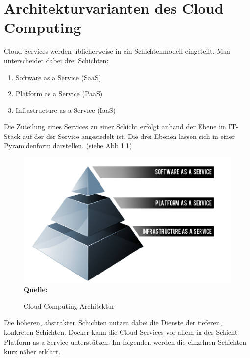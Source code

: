 \chapter{Architekturvarianten des Cloud Computing}
\label{cha:architekturvarianten_des_cloud_computing}
Cloud-Services werden üblicherweise in ein Schichtenmodell eingeteilt. Man unterscheidet dabei drei Schichten:
\begin{enumerate}
      \itemsep0pt
      \item Software as a Service (SaaS)\cite{microsoft_cloud_2014-1}
      \item Platform as a Service (PaaS)\cite{microsoft_cloud_2014-2}
      \item Infrastructure as a Service (IaaS)\cite{microsoft_cloud_2014}
\end{enumerate}
Die Zuteilung eines Services zu einer Schicht erfolgt anhand der Ebene im IT-Stack auf der der Service angesiedelt ist.
Die drei Ebenen lassen sich in einer Pyramidenform darstellen. (siehe Abb \ref{fig:iaas_paas_saas}) 

\begin{figure}[htb]
  \centering  
  \includegraphics[scale=0.7]{img/iaas_paas_saas.png}\\
  \footnotesize\sffamily\textbf{Quelle:} \cite{kepes_understanding_2014}
  \caption{Cloud Computing Architektur}
  \label{fig:iaas_paas_saas}
\end{figure}

Die höheren, abstrakten Schichten nutzen dabei die Dienste der tieferen, konkreten Schichten.
Docker kann die Cloud-Services vor allem in der Schicht Platform as a Service unterstützen.
Im folgenden werden die einzelnen Schichten kurz näher erklärt.

